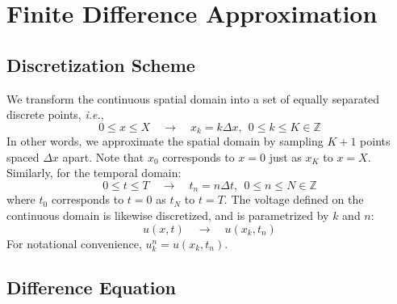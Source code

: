 \documentclass{article}
\begin{document}
\section{Finite Difference Approximation}
\label{sec: Finite Difference Approximation}

\subsection{Discretization Scheme}
\label{subsec: Discretization Scheme}

We transform the continuous spatial domain into a set of equally separated discrete points, \textit{i.e.},
\begin{equation*}
   0 \leq x \leq X \quad
   \longrightarrow \quad
   x_{k} = k \Delta x,\ \ 0 \leq k \leq K \in \mathbb{Z}
\end{equation*}
In other words, we approximate the spatial domain by sampling $K+1$ points spaced $\Delta x$ apart.
Note that $x_{0}$ corresponds to $x=0$ just as $x_{K}$ to $x=X$.
Similarly, for the temporal domain:
\begin{equation*}
   0 \leq t \leq T \quad
   \longrightarrow \quad
   t_{n} = n \Delta t,\ \ 0 \leq n \leq N \in \mathbb{Z}
\end{equation*}
where $t_0$ corresponds to $t=0$ as $t_{N}$ to $t=T$.
The voltage defined on the continuous domain is likewise discretized,
and is parametrized by $k$ and $n$:
\begin{equation*}
   u \left(x,t\right) \quad
   \longrightarrow \quad
   u \left(x_{k},t_{n}\right)
\end{equation*}
For notational convenience, $u_{k}^{n} = u \left(x_{k},t_{n}\right)$.

\subsection{Difference Equation}
\label{subsec: Difference Equation}
\end{document}
